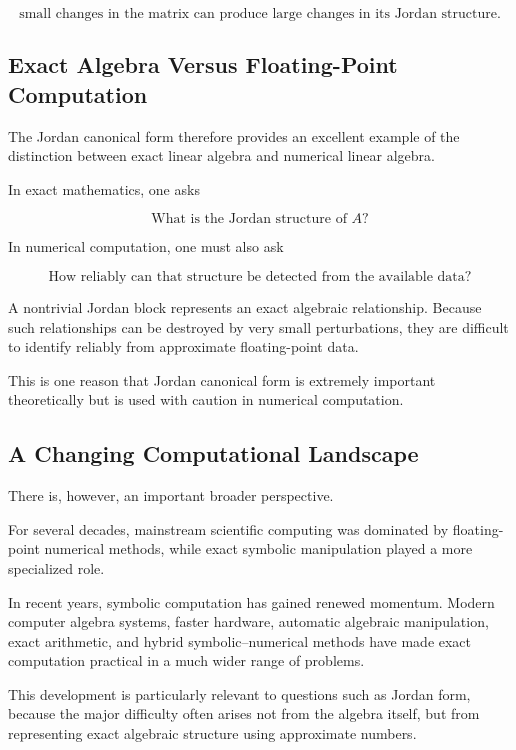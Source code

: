 \documentclass[11pt]{article}
\begin{document}
\[
\boxed{
\text{small changes in the matrix can produce large changes in its
Jordan structure}.
}
\]


\subsection{Exact Algebra Versus Floating-Point Computation}

The Jordan canonical form therefore provides an excellent example of
the distinction between exact linear algebra and numerical linear
algebra.

In exact mathematics, one asks

\[
\boxed{
\text{What is the Jordan structure of }A?
}
\]

In numerical computation, one must also ask

\[
\boxed{
\text{How reliably can that structure be detected from the available
data?}
}
\]

A nontrivial Jordan block represents an exact algebraic relationship.
Because such relationships can be destroyed by very small perturbations,
they are difficult to identify reliably from approximate floating-point
data.

This is one reason that Jordan canonical form is extremely important
theoretically but is used with caution in numerical computation.


\subsection{A Changing Computational Landscape}

There is, however, an important broader perspective.

For several decades, mainstream scientific computing was dominated by
floating-point numerical methods, while exact symbolic manipulation
played a more specialized role.

In recent years, symbolic computation has gained renewed momentum.
Modern computer algebra systems, faster hardware, automatic algebraic
manipulation, exact arithmetic, and hybrid symbolic--numerical methods
have made exact computation practical in a much wider range of
problems.

This development is particularly relevant to questions such as Jordan
form, because the major difficulty often arises not from the algebra
itself, but from representing exact algebraic structure using
approximate numbers.
\end{document}
